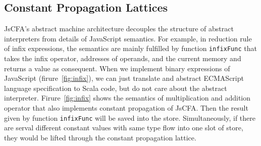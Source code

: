 \documentclass{article}
\begin{document}
\subsection{Constant Propagation Lattices}
\label{sub:Constant Propagation Lattices}

JsCFA's abstract machine architecture decouples the structure of abstract interpreters from details of JavaScript semantics. For example, in reduction rule of infix expressions, the semantics are mainly fulfilled by function \verb|infixFunc| that takes the infix operator, addresses of operands, and the current memory and returns a value as consequent. When we implement binary expressions of JavaScript (firure~\ref{fig:infix}), we can just translate and abstract ECMAScript language specification to Scala code, but do not care about the abstract interpreter. Firure~\ref{fig:infix} shows the semantics of multiplication and addition operator that also implements constant propagation of JsCFA\@. Then the result given by function \verb|infixFunc| will be saved into the store. Simultaneously, if there are serval different constant values with same type flow into one slot of store, they would be lifted through the constant propagation lattice.



\end{document}
